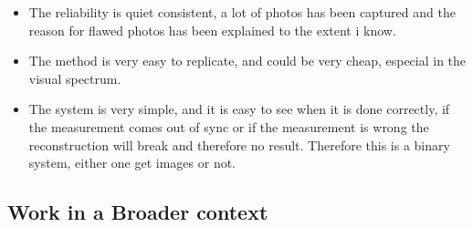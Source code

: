 
\begin{itemize}
\item The reliability is quiet consistent, a lot of photos has been captured and the reason for flawed photos has been explained to the extent i know.

\item The method is very easy to replicate, and could be very cheap, especial in the visual spectrum. 
\end{itemize}

\begin{itemize}
\item The system is very simple, and it is easy to see when it is done correctly, if the measurement comes out of sync or if the measurement is wrong the reconstruction will break and therefore no result. Therefore this is a binary system, either one get images or not.
\end{itemize}

\subsection{Work in a Broader context}

